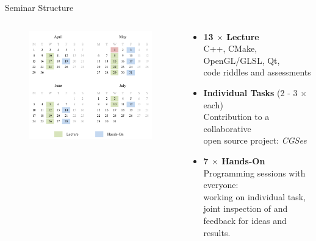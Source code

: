 \begin{frame}[fragile]{Seminar Structure}

	\begin{columns}
		\begin{column}{0.5\textwidth}

			\begin{figure}
				\includegraphics[width=\textwidth]{intro/calendar}
			\end{figure}

		\end{column}
		\begin{column}{0.5\textwidth}

			\small
			\begin{itemize}
			
				\pause
				\item \textbf{13 $\times$ Lecture}\\
					C++, CMake, OpenGL/GLSL, Qt,\\
					code riddles and assessments
					\smallskip

				\pause
				\item \textbf{Individual Tasks} (2 - 3 $\times$ each)\\
					Contribution to a collaborative\\
					open source project: \emph{CGSee}
					\smallskip

				\pause
				\item  \textbf{7 $\times$ Hands-On}\\
					Programming sessions with everyone:\\
					working on individual task, joint inspection of and feedback for ideas and results.
					\smallskip
				

\end{itemize}
\end{column}
\end{columns}
\end{frame}
